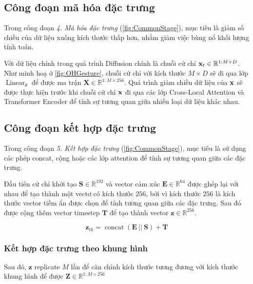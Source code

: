 \subsection{Công đoạn mã hóa đặc trưng}

Trong công đoạn \textit{4. Mã hóa đặc trưng} (\autoref{fig:CommonStage}), mục tiêu là giảm số chiều của dữ liệu xuống kích thước thấp hơn, nhằm giảm việc bùng nổ khối lượng tính toán.

Với dữ liệu chính trong quá trình Diffusion chính là chuỗi cử chỉ $\mathbf{x}_t \in \mathbb{R}^{1:M \times D}$. Như minh hoạ ở \autoref{fig:OHGesture}, chuỗi cử chỉ với kích thước $M \times D$ sẽ đi qua lớp $\operatorname{Linear}_{\theta}$ để được ma trận $\mathbf{X} \in \mathbb{R}^{1:M \times 256}$. Quá trình giảm chiều dữ liệu của $\mathbf{x}$ sẽ được thực hiện trước khi chuỗi cử chỉ $\mathbf{x}$ đi qua các lớp Cross-Local Attention và Transformer Encoder để tính sự tương quan giữa nhiều loại dữ liệu khác nhau.


\subsection{Công đoạn kết hợp đặc trưng}

Trong công đoạn \textit{5. Kết hợp đặc trưng} (\autoref{fig:CommonStage}), mục tiêu là sử dụng các phép concat, cộng hoặc các lớp attention để tính sự tương quan giữa các đặc trưng.

Đầu tiên cử chỉ khởi tạo $\mathbf{S} \in \mathbb{R}^{192}$ và vector cảm xúc $\mathbf{E} \in \mathbb{R}^{64}$ được ghép lại với nhau để tạo thành một vectơ có kích thước $256$, bởi vì kích thước $256$ là kích thước vector tiềm ẩn được chọn để tính tương quan giữa các đặc trưng. Sau đó được cộng thêm vector timestep $\mathbf{T}$ để tạo thành vector $\mathbf{z} \in \mathbb{R}^{256}$.

\begin{equation}
	\label{eq:ConditionConcat}
	\mathbf{z}_{tk} = \operatorname{concat }(\mathbf{E}\ || \  \mathbf{S}) + \mathbf{T}
\end{equation}

\subsubsection{Kết hợp đặc trưng theo khung hình}

Sau đó, $\mathbf{z}$  replicate $M$ lần để căn chỉnh kích thước tương đương với kích thước khung hình để được $\mathbf{Z} \in \mathbb{R}^{1:M \times 256}$

